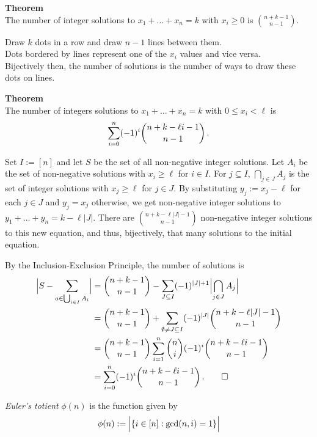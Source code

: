 \documentclass[a4paper]{article}
\let\oldendproof\endproof
\renewenvironment{proof}[1][\proofname]{%
  \oldproof[\scshape \noindent {\bfseries \text{Proof}}]%
}{\oldendproof}
\newcommand{\definition}{\bigskip\noindent{\bf Definition.}\;\;}
\newenvironment{thm}[1]{
	\begin{framed}
	\noindent
	{\bfseries #1}\\}{\setlength{\itemsep}{0pt}
	\end{framed}
}
\newcommand{\abs}[1]{\Bigl| #1 \Bigr|}
\begin{document}
\begin{thm}{Theorem}
The number of integer solutions to $x_1 + \dots + x_n = k$ with $x_i \geq 0$ is
$\binom{n+k-1}{n-1}$.
\end{thm}

\begin{proof}
Draw $k$ dots in a row and draw $n-1$ lines between them.\\
Dots bordered by lines represent one of the $x_i$ values and vice versa.\\
Bijectively then, the number of solutions is the number of ways to draw these dots on
lines.
\end{proof}

\begin{thm}{Theorem}
The number of integers solutions to $x_1 + \dots + x_n = k$ with $0 \leq x_i < \ell$ is
\[ \sum_{i=0}^n (-1)^i \binom{n+k-\ell i -1}{n-1}\,.\vspace*{-2mm}\]
\end{thm}

\begin{proof}
Set $I:=[n]$ and let $S$ be the set of all non-negative integer solutions.
Let $A_i$ be the set of non-negative solutions with $x_i \geq \ell$ for $i \in I$.
For $j\subseteq I$, $\bigcap_{j \in J} A_j$ is the set of integer solutions with $x_j \geq
\ell$ for $j \in J$.
By substituting $y_j := x_j -\ell$ for each $j \in J$ and $y_j = x_j$ otherwise,
we get non-negative integer solutions to $y_1 + \dots + y_n = k - \ell |J|$.
There are $\binom{n+k - \ell |J| - 1}{n-1}$ non-negative integer solutions to this new
equation,
and thus, bijectively, that many solutions to the initial equation.

By the Inclusion-Exclusion Principle, the number of solutions is
\begin{align*}
	  \abs{S - \sum_{a \in \bigcup_{i \in I} A_i}}
  & = \binom{n+k-1}{n-1} - \sum_{J \subseteq I} (-1)^{|J|+1} \abs{\bigcap_{j \in J} A_j}\\
  & = \binom{n+k-1}{n-1} + \sum_{\emptyset \neq J \subseteq I}
  (-1)^{|J|}\binom{n+k-\ell|J|-1}{n-1}\\
  & = \binom{n+k-1}{n-1} \sum_{i=1}^n \binom{n}{i} (-1)^i \binom{n+k-\ell i -1}{n-1}\\
  & = \sum_{i=0}^n (-1)^i \binom{n+k-\ell i - 1}{n-1}\,.\qedhere
\end{align*}
\end{proof}

\definition
\emph{Euler's totient} $\phi(n)$ is the function given by
	\[ \phi(n) := \abs{\{i \in [n] : \gcd(n,i) = 1\}}\]
\end{document}
